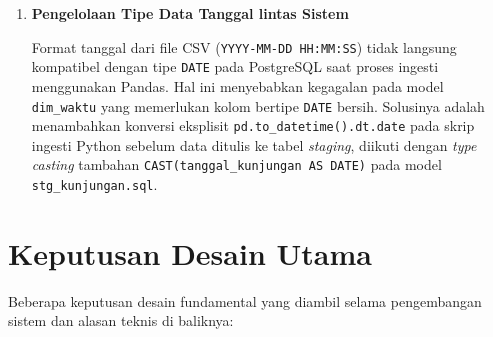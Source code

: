 \begin{enumerate}
  \item \textbf{Pengelolaan Tipe Data Tanggal lintas Sistem}
 
  Format tanggal dari file CSV (\texttt{YYYY-MM-DD HH:MM:SS}) tidak langsung kompatibel dengan tipe \texttt{DATE} pada PostgreSQL saat proses ingesti menggunakan Pandas. Hal ini menyebabkan kegagalan pada model \texttt{dim\_waktu} yang memerlukan kolom bertipe \texttt{DATE} bersih. Solusinya adalah menambahkan konversi eksplisit \texttt{pd.to\_datetime().dt.date} pada skrip ingesti Python sebelum data ditulis ke tabel \textit{staging}, diikuti dengan \textit{type casting} tambahan \texttt{CAST(tanggal\_kunjungan AS DATE)} pada model \texttt{stg\_kunjungan.sql}.
 
\end{enumerate}
 
\section{Keputusan Desain Utama}
 
Beberapa keputusan desain fundamental yang diambil selama pengembangan sistem dan alasan teknis di baliknya:
 

